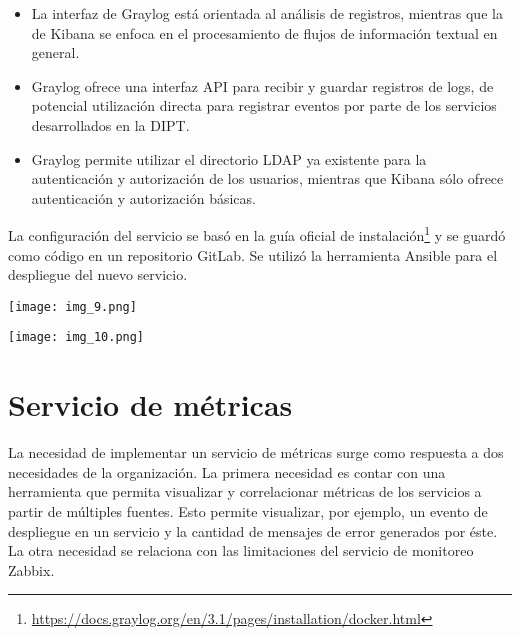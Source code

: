 \begin{itemize}
\item La interfaz de Graylog está orientada al análisis de registros,
  mientras que la de Kibana se enfoca en el procesamiento de flujos de
  información textual en general.
\item Graylog ofrece una interfaz API para recibir y guardar registros
  de logs, de potencial utilización directa para registrar eventos por
  parte de los servicios desarrollados en la DIPT.
\item Graylog permite utilizar el directorio LDAP ya existente para la
  autenticación y autorización de los usuarios, mientras que Kibana
  sólo ofrece autenticación y autorización básicas.
\end{itemize}
La configuración del servicio se basó en la guía oficial de
instalación\footnote{
  \href{https://docs.graylog.org/en/3.1/pages/installation/docker.html}{https://docs.graylog.org/en/3.1/pages/installation/docker.html}
} y se guardó como código en un repositorio GitLab. Se utilizó la
herramienta Ansible para el despliegue del nuevo servicio.

\texttt{[image: img\_9.png]}



\texttt{[image: img\_10.png]}



\section{Servicio de métricas}

La necesidad de implementar un servicio de métricas surge como
respuesta a dos necesidades de la organización. La primera necesidad
es contar con una herramienta que permita visualizar y correlacionar
métricas de los servicios a partir de múltiples fuentes. Esto permite
visualizar, por ejemplo, un evento de despliegue en un servicio y la
cantidad de mensajes de error generados por éste. La otra necesidad se
relaciona con las limitaciones del servicio de monitoreo Zabbix.

